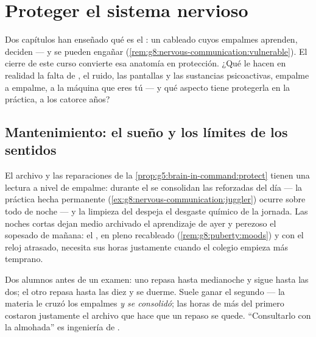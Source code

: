 \chapter{Proteger el sistema nervioso}\label{ch:g8:protecting-the-nervous-system}

Dos capítulos han enseñado qué es el : un cableado
cuyos empalmes aprenden, deciden --- y se pueden engañar
(\cref{rem:g8:nervous-communication:vulnerable}). El cierre de este
curso convierte esa anatomía en protección. ¿Qué le hacen en realidad
la falta de , el ruido, las pantallas y las sustancias
psicoactivas, empalme a empalme, a la máquina que eres tú --- y qué
aspecto tiene protegerla en la práctica, a los catorce años?

\section{Mantenimiento: el sueño y los límites de los sentidos}

\begin{proposition}\label{prop:g8:protecting-the-nervous-system:sleep}
El archivo y las reparaciones de la
\cref{prop:g5:brain-in-command:protect} tienen una lectura a nivel de
empalme: durante el  se consolidan las  reforzadas del día
--- la práctica hecha permanente
(\cref{ex:g8:nervous-communication:juggler}) ocurre sobre todo de noche
--- y la limpieza del  despeja el desgaste químico de la
jornada. Las noches cortas dejan medio archivado el aprendizaje de ayer
y perezoso el sopesado de mañana: el  , en pleno
recableado (\cref{rem:g8:puberty:moods}) y con el reloj atrasado,
necesita sus horas justamente cuando el colegio empieza más temprano.
\end{proposition}
\admitted

\begin{example}\label{ex:g8:protecting-the-nervous-system:revision}
Dos alumnos antes de un examen: uno repasa hasta medianoche y sigue
hasta las dos; el otro repasa hasta las diez y se duerme. Suele ganar
el segundo --- la materia le cruzó los empalmes \emph{y se consolidó};
las horas de más del primero costaron justamente el archivo que hace
que un repaso se quede. ``Consultarlo con la almohada'' es ingeniería
de .
\end{example}

